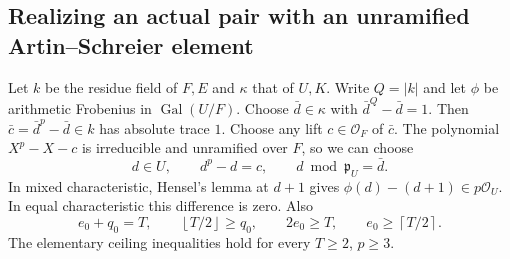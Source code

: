 \documentclass[11pt]{amsart}
\theoremstyle{definition}
\theoremstyle{remark}
\newcommand{\Gal}{\operatorname{Gal}}
\newcommand{\ceil}[1]{\left\lceil #1\right\rceil}
\newcommand{\floor}[1]{\left\lfloor #1\right\rfloor}
\newcommand{\OO}{\mathcal O}\newcommand{\pp}{\mathfrak p}\newcommand{\PP}{\mathfrak P}
\begin{document}
\subsection{Realizing an actual pair with an unramified Artin--Schreier element}
Let $k$ be the residue field of $F,E$ and $\kappa$ that of $U,K$.
Write $Q=|k|$ and let $\phi$ be arithmetic Frobenius in $\Gal(U/F)$.
Choose $\bar d\in\kappa$ with $\bar d^Q-\bar d=1$.
Then $\bar c=\bar d^p-\bar d\in k$ has absolute trace $1$.
Choose any lift $c\in\OO_F$ of $\bar c$. The polynomial
$X^p-X-c$ is irreducible and unramified over $F$, so we can choose
\begin{equation}\label{O:I:dchoice}
 d\in U,\qquad d^p-d=c,\qquad d\bmod\pp_U=\bar d.
\end{equation}
In mixed characteristic, Hensel's lemma at $d+1$ gives
$\phi(d)-(d+1)\in p\OO_U$. In equal characteristic this difference is zero.
Also
\begin{equation}\label{O:I:boundse0}
 e_0+q_0=T,\qquad
 \floor{T/2}\ge q_0,\qquad 2e_0\ge T,
 \qquad e_0\ge\ceil{T/2}.
\end{equation}
The elementary ceiling inequalities hold for every $T\ge2$, $p\ge3$.
\end{document}
